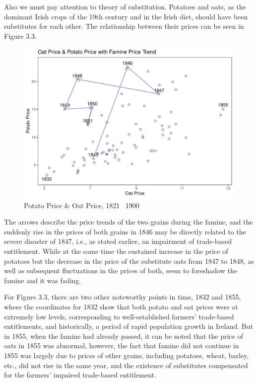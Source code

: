 Also we must pay attention to theory of substitution. Potatoes and oats, as the dominant Irish crops of the 19th century and in the Irish diet, should have been substitutes for each other. The relationship between their prices can be seen in Figure 3.3.

\begin{figure}[htbp]
    \centering
    \caption{Potato Price \& Oat Price, 1821 \textendash\ 1900}
    \includegraphics[width=.95\textwidth]{../03_outputs/grain_substituion.pdf}
\end{figure}

The arrows describe the price trends of the two grains during the famine, and the suddenly rise in the prices of both grains in 1846 may be directly related to the severe disaster of 1847, i.e., as stated earlier, an impairment of trade-based entitlement. While at the same time the sustained increase in the price of potatoes but the decrease in the price of the substitute oats from 1847 to 1848, as well as subsequent fluctuations in the prices of both, seem to foreshadow the famine and it was fading.

For Figure 3.3, there are two other noteworthy points in time, 1832 and 1855, where the coordinates for 1832 show that both potato and oat prices were at extremely low levels, corresponding to well-established farmers' trade-based entitlements, and historically, a period of rapid population growth in Ireland. But in 1855, when the famine had already passed, it can be noted that the price of oats in 1855 was abnormal, however, the fact that famine did not continue in 1855 was largely due to prices of other grains, including potatoes, wheat, barley, etc., did not rise in the same year, and the existence of substitutes compensated for the farmers' impaired trade-based entitlement.

